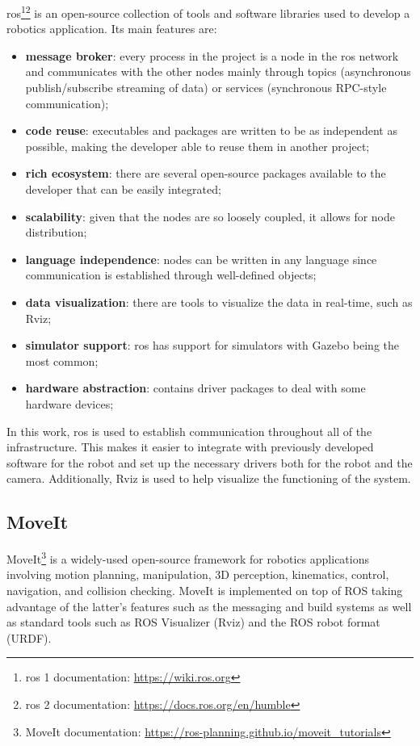 \acs{ros}\cite{ROS2}\footnote{\acs{ros} 1 documentation: \url{https://wiki.ros.org}}\footnote{\acs{ros} 2 documentation: \url{https://docs.ros.org/en/humble}} is an open-source collection of tools and software libraries used to develop a robotics application. Its main features are:

\begin{itemize}
    \item \textbf{message broker}: every process in the project is a node in the \acs{ros} network and communicates with the other nodes mainly through topics (asynchronous publish/subscribe streaming of data) or services (synchronous RPC-style communication);
    \item \textbf{code reuse}: executables and packages are written to be as independent as possible, making the developer able to reuse them in another project;
    \item \textbf{rich ecosystem}: there are several open-source packages available to the developer that can be easily integrated;
    \item \textbf{scalability}: given that the nodes are so loosely coupled, it allows for node distribution;
    \item \textbf{language independence}: nodes can be written in any language since communication is established through well-defined objects;
    \item \textbf{data visualization}: there are tools to visualize the data in real-time, such as Rviz;
    \item \textbf{simulator support}: \acs{ros} has support for simulators with Gazebo being the most common;
    \item \textbf{hardware abstraction}: contains driver packages to deal with some hardware devices;
\end{itemize}

In this work, \acs{ros} is used to establish communication throughout all of the infrastructure. This makes it easier to integrate with previously developed software for the robot and set up the necessary drivers both for the robot and the camera. Additionally, Rviz is used to help visualize the functioning of the system.

\subsection{MoveIt}

MoveIt\footnote{MoveIt documentation: \url{https://ros-planning.github.io/moveit_tutorials}} is a widely-used open-source framework for robotics applications involving motion planning, manipulation, 3D perception, kinematics, control, navigation, and collision checking. MoveIt is implemented on top of ROS taking advantage of the latter's features such as the messaging and build systems as well as standard tools such as ROS Visualizer (Rviz) and the ROS robot format (URDF).

